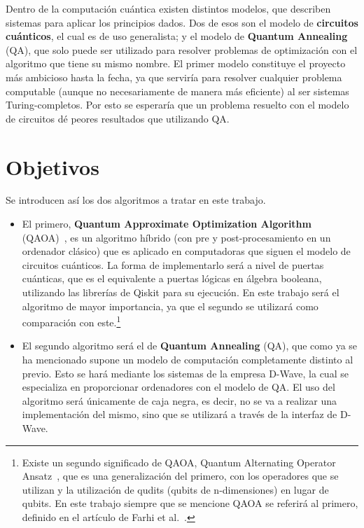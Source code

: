Dentro de la computación cuántica existen distintos modelos, que describen sistemas para aplicar los principios dados.
Dos de esos son el modelo de \textbf{circuitos cuánticos}, el cual es de uso generalista; y el modelo de \textbf{Quantum Annealing} (QA), que solo puede ser utilizado para resolver problemas de optimización con el algoritmo que tiene su mismo nombre.
El primer modelo constituye el proyecto más ambicioso hasta la fecha, ya que serviría para resolver cualquier problema computable (aunque no necesariamente de manera más eficiente) al ser sistemas Turing-completos.
Por esto se esperaría que un problema resuelto con el modelo de circuitos dé peores resultados que utilizando QA\@.

\section{Objetivos}

Se introducen así los dos algoritmos a tratar en este trabajo.
\begin{itemize}
\item El primero, \textbf{Quantum Approximate Optimization Algorithm} (QAOA)~\cite{qaoa_paper_original}, es un algoritmo híbrido (con pre y post-procesamiento en un ordenador clásico) que es aplicado en computadoras que siguen el modelo de circuitos cuánticos.
  La forma de implementarlo será a nivel de puertas cuánticas, que es el equivalente a puertas lógicas en álgebra booleana, utilizando las librerías de Qiskit para su ejecución.
  En este trabajo será el algoritmo de mayor importancia, ya que el segundo se utilizará como comparación con este.\footnote{
    Existe un segundo significado de QAOA, Quantum Alternating Operator Ansatz~\cite{quantum_alternating_operator_ansatz}, que es una generalización del primero, con los operadores que se utilizan y la utilización de qudits (qubits de n-dimensiones) en lugar de qubits.
    En este trabajo siempre que se mencione QAOA se referirá al primero, definido en el artículo de Farhi et al.~\cite{qaoa_paper_original}.
  }

\item El segundo algoritmo será el de \textbf{Quantum Annealing} (QA), que como ya se ha mencionado supone un modelo de computación completamente distinto al previo.
  Esto se hará mediante los sistemas de la empresa D-Wave, la cual se especializa en proporcionar ordenadores con el modelo de QA\@.
  El uso del algoritmo será únicamente de caja negra, es decir, no se va a realizar una implementación del mismo, sino que se utilizará a través de la interfaz de D-Wave.
\end{itemize}

